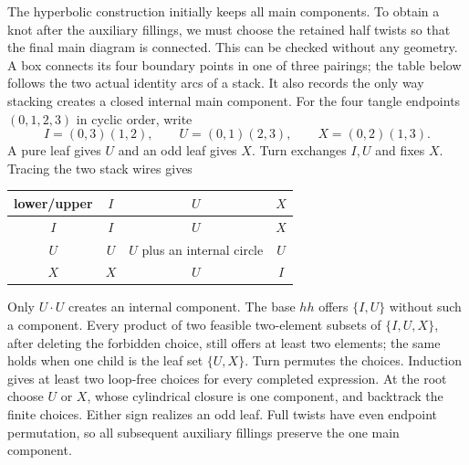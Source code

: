 The hyperbolic construction initially keeps all main components. To obtain a knot after the auxiliary fillings, we must choose the retained half twists so that the final main diagram is connected. This can be checked without any geometry. A box connects its four boundary points in one of three pairings; the table below follows the two actual identity arcs of a stack. It also records the only way stacking creates a closed internal main component.
For the four tangle endpoints $(0,1,2,3)$ in cyclic order, write
\[
 I=(0,3)(1,2),\qquad U=(0,1)(2,3),\qquad X=(0,2)(1,3).
\]
A pure leaf gives $U$ and an odd leaf gives $X$. Turn exchanges $I,U$ and fixes $X$. Tracing the two stack wires gives
\begin{center}
\begin{tabular}{c|ccc}
 lower/upper & $I$ & $U$ & $X$\\\hline
$I$ & $I$ & $U$ & $X$\\
$U$ & $U$ & $U$ plus an internal circle & $U$\\
$X$ & $X$ & $U$ & $I$
\end{tabular}
\end{center}
Only $U\cdot U$ creates an internal component. The base $hh$ offers $\{I,U\}$ without such a component. Every product of two feasible two-element subsets of $\{I,U,X\}$, after deleting the forbidden choice, still offers at least two elements; the same holds when one child is the leaf set $\{U,X\}$. Turn permutes the choices. Induction gives at least two loop-free choices for every completed expression. At the root choose $U$ or $X$, whose cylindrical closure is one component, and backtrack the finite choices. Either sign realizes an odd leaf. Full twists have even endpoint permutation, so all subsequent auxiliary fillings preserve the one main component.
